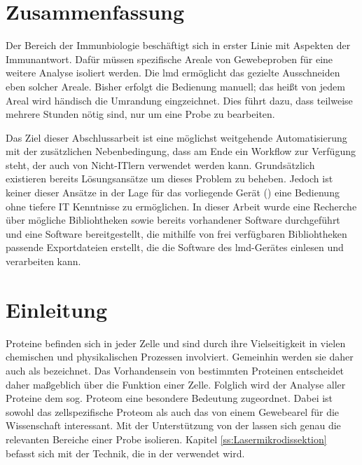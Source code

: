 \documentclass[11pt, a4paper, oneside]{article}
\begin{document}
\printglossary[title={Abkürzungsverzeichnis}]
\newpage

\section{Zusammenfassung}\label{s:Zusammenfassung}
Der Bereich der Immunbiologie beschäftigt sich in erster Linie mit Aspekten der Immunantwort. Dafür müssen spezifische Areale von Gewebeproben für eine weitere Analyse isoliert werden. Die \gls{lmd} ermöglicht das gezielte Ausschneiden eben solcher Areale. Bisher erfolgt die Bedienung manuell; das heißt von jedem Areal wird händisch die Umrandung eingzeichnet. Dies führt dazu, dass teilweise mehrere Stunden nötig sind, nur um eine Probe zu bearbeiten.

Das Ziel dieser Abschlussarbeit ist eine möglichst weitgehende Automatisierung mit der zusätzlichen Nebenbedingung, dass am Ende ein Workflow zur Verfügung steht, der auch von Nicht-ITlern verwendet werden kann. Grundsätzlich existieren bereits Lösungsansätze um dieses Problem zu beheben. Jedoch ist keiner dieser Ansätze in der Lage für das vorliegende Gerät () eine Bedienung ohne tiefere IT Kenntnisse zu ermöglichen. In dieser Arbeit wurde eine Recherche über mögliche Bibliohtheken sowie bereits vorhandener Software durchgeführt und eine Software bereitgestellt, die mithilfe von frei verfügbaren Bibliohtheken passende Exportdateien erstellt, die die Software des \gls{lmd}-Gerätes einlesen und verarbeiten kann.
\newpage

\tableofcontents
\newpage

\section{Einleitung}\label{s:Einleitung}
Proteine befinden sich in jeder Zelle und sind durch ihre Vielseitigkeit in vielen chemischen und physikalischen Prozessen involviert. Gemeinhin werden sie daher auch als  bezeichnet. Das Vorhandensein von bestimmten Proteinen entscheidet daher maßgeblich über die Funktion einer Zelle. Folglich wird der Analyse aller Proteine \dashAndSpace dem sog. Proteom \dashAndSpace eine besondere Bedeutung zugeordnet. Dabei ist sowohl das zellspezifische Proteom als auch das von einem Gewebearel für die Wissenschaft interessant. Mit der Unterstützung von der  lassen sich genau die relevanten Bereiche einer Probe isolieren. Kapitel \ref{ss:Lasermikrodissektion} befasst sich mit der Technik, die in der  verwendet wird.
\end{document}

